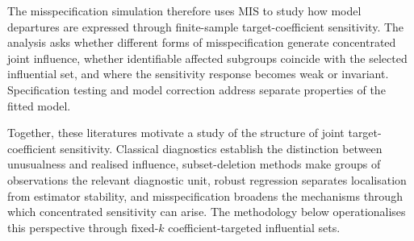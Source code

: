 \documentclass[../main.tex]{subfiles}
\begin{document}
The misspecification simulation therefore uses MIS to study how model departures are expressed through finite-sample target-coefficient sensitivity. The analysis asks whether different forms of misspecification generate concentrated joint influence, whether identifiable affected subgroups coincide with the selected influential set, and where the sensitivity response becomes weak or invariant. Specification testing and model correction address separate properties of the fitted model.

Together, these literatures motivate a study of the structure of joint target-coefficient sensitivity. Classical diagnostics establish the distinction between unusualness and realised influence, subset-deletion methods make groups of observations the relevant diagnostic unit, robust regression separates localisation from estimator stability, and misspecification broadens the mechanisms through which concentrated sensitivity can arise. The methodology below operationalises this perspective through fixed-\(k\) coefficient-targeted influential sets.
\end{document}
